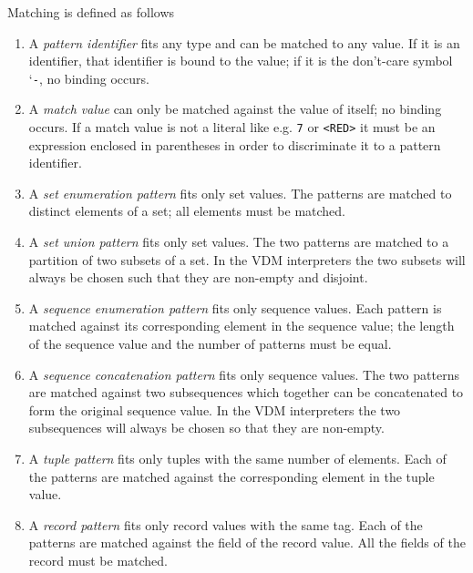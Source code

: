 \documentclass{overturerepchap}
\newcommand{\Lit}[1]{`{\tt #1}\Quote}
\begin{document}
\begin{description}
  Matching is defined as follows
  \begin{enumerate}
  \item A {\it pattern identifier} fits any type and can be matched to any
    value. If it is an identifier, that identifier is bound to the value;
    if it is the don't-care symbol \Lit{-}, no binding occurs.

  \item A {\it match value} can only be matched against the value of
    itself; no binding occurs. If a match value is not a literal like e.g.
    {\tt 7} or {\tt <RED>} it must be an expression enclosed in parentheses in order to
    discriminate it to a pattern identifier.

  \item A {\it set enumeration pattern} fits only set values. The patterns
    are matched to distinct elements of a set; all elements must be
    matched.

  \item A {\it set union pattern} fits only set values. The two patterns
    are matched to a partition of two subsets of a set. In the VDM interpreters
    the two subsets will always be chosen such that they are non-empty
    and disjoint.

  \item A {\it sequence enumeration pattern} fits only sequence values.
    Each pattern is matched against its corresponding element in the
    sequence value; the length of the sequence value and the number of
    patterns must be equal.

  \item A {\it sequence concatenation pattern} fits only sequence values.
    The two patterns are matched against two subsequences which together
    can be concatenated to form the original sequence value. In the
    VDM interpreters the two subsequences will always be chosen so that they
    are non-empty.

  \item A {\it tuple pattern} fits only tuples with the same number of
    elements. Each of the patterns are matched against the corresponding
    element in the tuple value.

  \item A {\it record pattern} fits only record values with the same tag.
    Each of the patterns are matched against the field of the record value.
    All the fields of the record must be matched.
  \end{enumerate}


\end{description}
\end{document}
